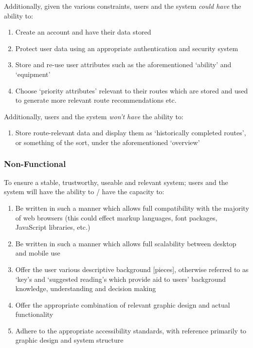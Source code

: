 \documentclass[11pt, english]{article}
\begin{document}
	Additionally, given the various constraints, users and the system \textit{could have} the ability to:

	\begin{enumerate}
	\setlength\itemsep{0cm}
		\item Create an account and have their data stored
		\item Protect user data using an appropriate authentication and security system
		\item Store and re-use user attributes such as the aforementioned `ability' and `equipment'
		\item Choose `priority attributes' relevant to their routes which are stored and used to generate more relevant route recommendations etc.
	\end{enumerate}

	Additionally, users and the system \textit{won't have} the ability to:

	\begin{enumerate}
	\setlength\itemsep{0cm}
		\item Store route-relevant data and display them as `historically completed routes', or something of the sort, under the aforementioned `overview'
	\end{enumerate}

		\subsubsection{Non-Functional}

	To ensure a stable, trustworthy, useable and relevant system; users and the system will have the ability to / have the capacity to:

	\begin{enumerate}
	\setlength\itemsep{0cm}
		\item Be written in such a manner which allows full compatibility with the majority of web browsers (this could effect markup languages, font packages, JavaScript libraries, etc.)
		\item Be written in such a manner which allows full scalability between desktop and mobile use
		\item Offer the user various descriptive background [pieces], otherwise referred to as `key's and `suggested reading's which provide aid to users' background knowledge, understanding and decision making
		\item Offer the appropriate combination of relevant graphic design and actual functionality
		\item Adhere to the appropriate accessibility standards, with reference primarily to graphic design and system structure
	\end{enumerate}
\end{document}
